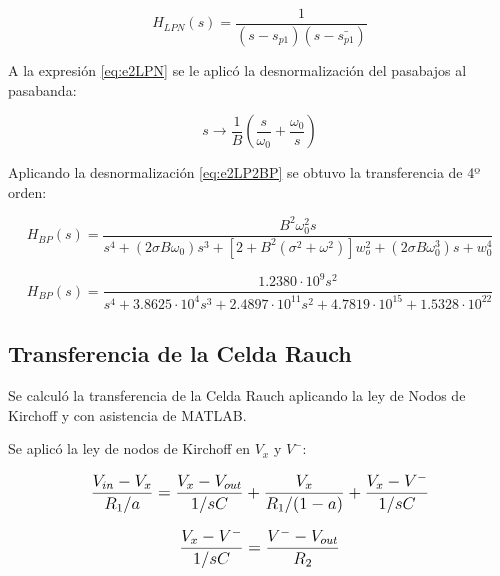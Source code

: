 \begin{equation}
H_{LPN}(s)=\frac{1}{(s-s_{p1})(s-\bar{s_{p1}})}
\label{eq:e2LPN}
\end{equation}

A la expresión \eqref{eq:e2LPN} se le aplicó la desnormalización del pasabajos al pasabanda:

\begin{equation}
s \rightarrow \frac{1}{B}\left(\frac{s}{\omega_0}+\frac{\omega_0}{s}\right)
\label{eq:e2LP2BP}
\end{equation}

Aplicando la desnormalización \eqref{eq:e2LP2BP} se obtuvo la transferencia de 4º orden:

\begin{equation}
H_{BP}(s) = \frac{B^2 \omega_0^2 s}{s^4 + \left(2 \sigma B \omega_0\right) s^3 + \left[ 2+B^2 \left(\sigma^2 + \omega^2 \right) \right] w_o^2 + \left(2 \sigma B \omega_0^3\right) s + w_0^4}
\end{equation}

\begin{equation*}
H_{BP}(s)=\frac{1.2380\cdot10^9s^2}{s^4+3.8625\cdot10^4 s^3+2.4897\cdot10^{11}s^2+4.7819\cdot10^{15}+1.5328\cdot10^{22}}
\end{equation*}

\subsection{Transferencia de la Celda Rauch}

Se calculó la transferencia de la Celda Rauch aplicando la ley de Nodos de Kirchoff y con asistencia de MATLAB.

\begin{figure}[ht]
\begin{center}

\end{center}
\end{figure}

Se aplicó la ley de nodos de Kirchoff en $V_x$ y $V^-$:

\begin{equation}
\mathlarger{
\frac{V_{in}-V_x}{R_1/a}=\frac{V_x-V_{out}}{1/sC}+\frac{V_x}{R_1/(1-a)}+\frac{V_x-V^-}{1/sC}
}
\label{eq:e2vx}
\end{equation}

\begin{equation}
\mathlarger{
\frac{V_x-V^-}{1/sC}=\frac{V^--V_{out}}{R_2}
}
\label{eq:e2v-}
\end{equation}

